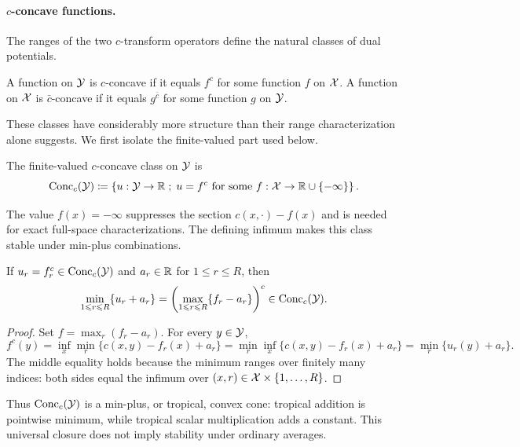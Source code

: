 \paragraph{$c$-concave functions.}

The ranges of the two $c$-transform operators define the natural classes of dual potentials.
\begin{defn}\label{def-c-concave-functions}
	A function on $\mathcal{Y}$ is $c$-concave if it equals $f^c$ for some function $f$ on $\mathcal{X}$. A function on $\mathcal{X}$ is $\bar c$-concave if it equals $g^{\bar c}$ for some function $g$ on $\mathcal{Y}$.
\end{defn}
These classes have considerably more structure than their range characterization alone suggests. We first isolate the finite-valued part used below.
\begin{defn}\label{def-finite-c-concave-class}
	The finite-valued $c$-concave class on $\mathcal{Y}$ is
	\[
	\operatorname{Conc}_c(\mathcal{Y})
	\coloneqq
	\left\{ u:\mathcal{Y}\to\mathbb{R} \;;\; u=f^c\text{ for some }f:\mathcal{X}\to\mathbb{R}\cup\{-\infty\} \right\}.
	\]
\end{defn}
The value $f(x)=-\infty$ suppresses the section $c(x,\cdot)-f(x)$ and is needed for exact full-space characterizations.
The defining infimum makes this class stable under min-plus combinations.
\begin{prop}\label{prop-c-concave-tropical-barycenter}
	If $u_r=f_r^c\in\operatorname{Conc}_c(\mathcal{Y})$ and $a_r\in\mathbb{R}$ for $1\leq r\leq R$, then
	\[
		\min_{1\leqslant r\leqslant R}\{u_r+a_r\}
		=
		\left(\max_{1\leqslant r\leqslant R}\{f_r-a_r\}\right)^c
		\in\operatorname{Conc}_c(\mathcal{Y}).
	\]
\end{prop}
\begin{proof}
	Set $f=\max_r(f_r-a_r)$. For every $y\in\mathcal{Y}$,
	\[
		f^c(y)
		=
		\inf_x\min_r\{c(x,y)-f_r(x)+a_r\}
		=
		\min_r\inf_x\{c(x,y)-f_r(x)+a_r\}
		=
		\min_r\{u_r(y)+a_r\}.
	\]
	The middle equality holds because the minimum ranges over finitely many indices: both sides equal the infimum over $(x,r)\in\mathcal{X}\times\{1,\ldots,R\}$.
\end{proof}
Thus $\operatorname{Conc}_c(\mathcal{Y})$ is a min-plus, or tropical, convex cone: tropical addition is pointwise minimum, while tropical scalar multiplication adds a constant. This universal closure does not imply stability under ordinary averages.

